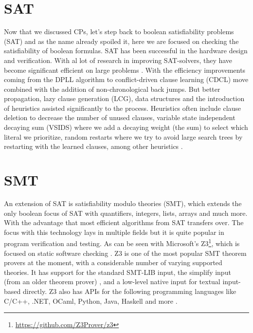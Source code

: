 
\section{SAT}
\label{CS:SAT}
Now that we discussed CPs, let's step back to boolean satisfiability problems (SAT) and as the name already spoiled it, here we are focused on checking the satisfiability of boolean formulas. SAT has been successful in the hardware design and verification. With al lot of research in improving SAT-solvers, they have become significant efficient on large problems \cite{56bardin2019bringing}.
With the efficiency improvements coming from the DPLL algorithm to conflict-driven clause learning (CDCL) move combined with the addition of non-chronological back jumps. But better propagation, lazy clause generation (LCG), data structures and the introduction of heuristics assisted significantly to the process. Heuristics often include clause deletion to decrease the number of unused clauses, variable state independent decaying sum (VSIDS) where we add a decaying weight (the sum) to select which literal we prioritize, random restarts where we try to avoid large search trees by restarting with the learned clauses, among other heuristics \cite{61MCSMarcDenecker, 60katebi2011empirical, 67stuckey2010lazyClauseGeneration}.



\section{SMT}
\label{CS:SMT}
An extension of SAT is satisfiability modulo theories (SMT), which extends the only boolean focus of SAT with quantifiers, integers, lists, arrays and much more. With the advantage that most efficient algorithms from SAT transfers over. The focus with this technology lays in multiple fields but it is quite popular in program verification and testing. As can be seen with Microsoft's Z3\footnote{\url{https://github.com/Z3Prover/z3}}, which is focused on static software checking \cite{54moura2008z3}. Z3 is one of the most popular SMT theorem provers at the moment, with a considerable number of varying supported theories. It has support for the standard SMT-LIB input, the simplify input (from an older theorem prover) \cite{73detlefs2005simplify}, and a low-level native input for textual input-based directly. Z3 also has APIs for the following programming languages like C/C++, .NET, OCaml, Python, Java, Haskell and more \cite{64WikiSMT}.

